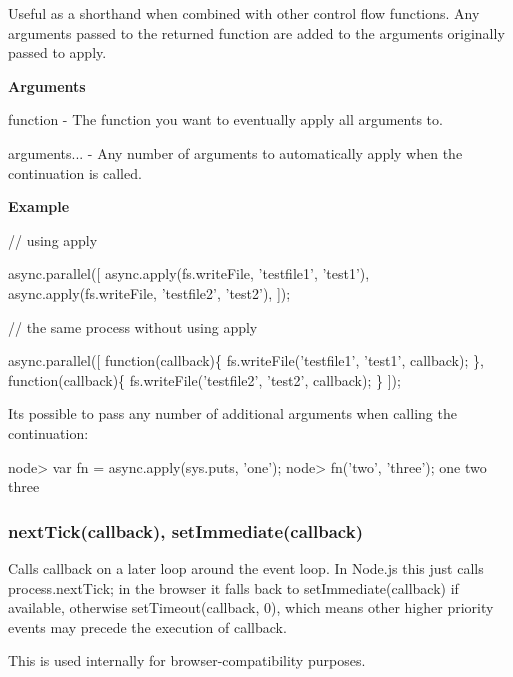 Useful as a shorthand when combined with other control flow functions. Any arguments passed to the returned function are added to the arguments originally passed to apply.

{\bfseries Arguments}


\begin{DoxyItemize}
\item {\ttfamily function} -\/ The function you want to eventually apply all arguments to.
\item {\ttfamily arguments...} -\/ Any number of arguments to automatically apply when the continuation is called.
\end{DoxyItemize}

{\bfseries Example}


\begin{DoxyCode}
// using apply

async.parallel([
    async.apply(fs.writeFile, 'testfile1', 'test1'),
    async.apply(fs.writeFile, 'testfile2', 'test2'),
]);


// the same process without using apply

async.parallel([
    function(callback)\{
        fs.writeFile('testfile1', 'test1', callback);
    \},
    function(callback)\{
        fs.writeFile('testfile2', 'test2', callback);
    \}
]);
\end{DoxyCode}


It\textquotesingle{}s possible to pass any number of additional arguments when calling the continuation\+:


\begin{DoxyCode}
node> var fn = async.apply(sys.puts, 'one');
node> fn('two', 'three');
one
two
three
\end{DoxyCode}
 



\label{_nextTick}%
 \subsubsection*{next\+Tick(callback), set\+Immediate(callback)}

Calls {\ttfamily callback} on a later loop around the event loop. In Node.\+js this just calls {\ttfamily process.\+next\+Tick}; in the browser it falls back to {\ttfamily set\+Immediate(callback)} if available, otherwise {\ttfamily set\+Timeout(callback, 0)}, which means other higher priority events may precede the execution of {\ttfamily callback}.

This is used internally for browser-\/compatibility purposes.

